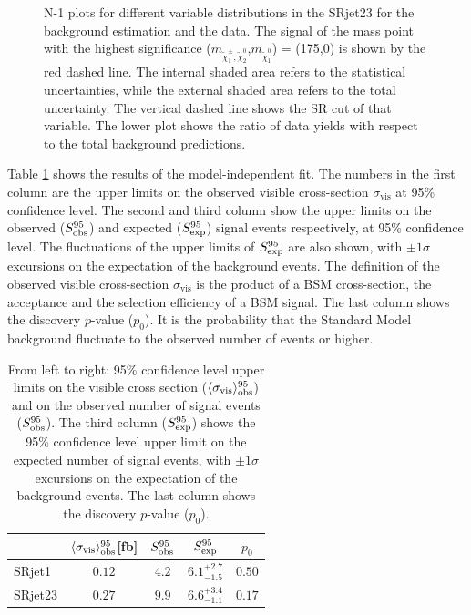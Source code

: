 \begin{figure}[htbp]
\caption{N-1 plots for different variable distributions in the SRjet23 for the background estimation and the data. The signal of the mass point with the highest significance ($m_{\tilde{\chi}_1^\pm , \tilde{\chi}_2^0}$,$m_{\tilde{\chi}_1^0}$) = (175,0) is shown by the red dashed line. The internal shaded area refers to the statistical uncertainties, while the external shaded area refers to the total uncertainty. The vertical dashed line shows the SR cut of that variable. The lower plot shows the ratio of data yields with respect to the total background predictions.}
\label{fig:result_Nminus1_2}
\end{figure}

Table \ref{tab:result_upper_limit} shows the results of the model-independent fit.
The numbers in the first column are the upper limits on the observed visible cross-section $\sigma_{\text{vis}}$ at 95\% confidence level.
The second and third column show the upper limits on the observed ($S_{\rm obs}^{95}$) and expected ($S_{\rm exp}^{95}$) signal events respectively, at 95\% confidence level.
The fluctuations of the upper limits of $S_{\rm exp}^{95}$ are also shown, with $\pm 1\sigma$ excursions on the expectation of the background events.
The definition of the observed visible cross-section $\sigma_{\text{vis}}$ is the product of a BSM cross-section, the acceptance and the selection efficiency of a BSM signal.
The last column shows the discovery $p$-value ($p_0$).
It is the probability that the Standard Model background fluctuate to the observed number of events or higher.

\begin{table}[htbp]
\begin{center}
\begin{tabular}{|l|cccc|}
\hline
& $\langle \sigma_{\text{vis}} \rangle_{\rm obs}^{95}$[fb]  &  $S_{\rm obs}^{95}$  & $S_{\rm exp}^{95}$ & $p_0$ \\
\hline
\hline
SRjet1  & $0.12$ & $4.2$ & $ { 6.1 }^{ +2.7 }_{ -1.5 }$ & $ 0.50$ \\
\hline
SRjet23 & $0.27$ & $9.9$ & $ { 6.6 }^{ +3.4 }_{ -1.1 }$ & $ 0.17$ \\
\hline
\end{tabular}
\caption{
From left to right:
95\% confidence level upper limits on the visible cross section ($\langle \sigma_{\text{vis}} \rangle_{\rm obs}^{95}$)
and on the observed number of signal events ($S_{\rm obs}^{95}$).
The third column ($S_{\rm exp}^{95}$) shows the 95\% confidence level upper limit on the expected number of signal events,
with $\pm 1\sigma$ excursions on the expectation of the background events.
The last column shows the discovery $p$-value ($p_0$).}
\label{tab:result_upper_limit}
\end{center}
\end{table}


